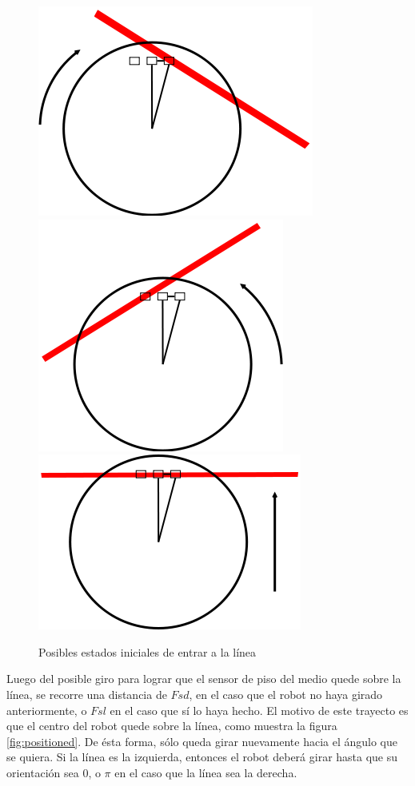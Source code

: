 \begin{figure}[htp]
\begin{center}
\includegraphics[scale=0.4]{comportamientos/floorSensorsLine.png}
\includegraphics[scale=0.4]{comportamientos/floorSensorsLine1.png}
\includegraphics[scale=0.4]{comportamientos/floorSensorsLine2.png}
\caption{Posibles estados iniciales de entrar a la l\'inea}
\label{fig:floorSensorsStates}
\end{center}
\end{figure}


Luego del posible giro para lograr que el sensor de piso del medio quede sobre la l\'inea, 
se recorre una distancia de $Fsd$, en el caso que el robot no haya girado anteriormente, o $Fsl$ en
el caso que s\'i lo haya hecho. El motivo de este trayecto es que el centro del robot quede
sobre la l\'inea, como muestra la figura \ref{fig:positioned}. De \'esta forma, s\'olo queda
girar nuevamente hacia el \'angulo que se quiera. Si la l\'inea es la izquierda, entonces el
robot deber\'a girar hasta que su orientaci\'on sea $0$, o $\pi$ en el caso que la l\'inea
sea la derecha.

